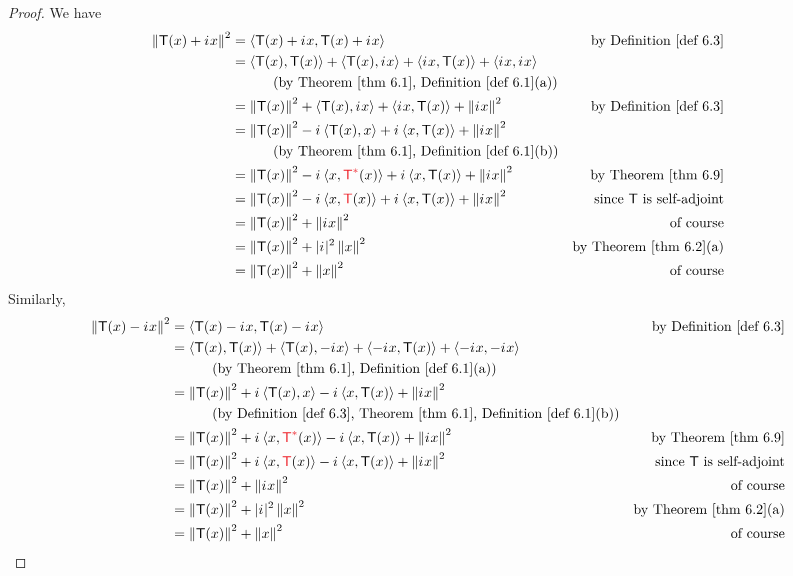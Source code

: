 \begin{proof}
We have
\begin{align*}
    \norm{\T(x) + \iu x}^2
        & = \LG \T(x) + \iu x, \T(x) + \iu x \RG & \text{by \DEF{6.3}} \\
        & = \LG \T(x), \T(x) \RG
          + \LG \T(x), \iu x \RG
          + \LG \iu x, \T(x) \RG
          + \LG \iu x, \iu x \RG \\
          & \quad \quad \quad \text{(by \THM{6.1}, \DEF{6.1}(a))} \\
        & = \norm{\T(x)}^2
          + \LG \T(x), \iu x \RG
          + \LG \iu x, \T(x) \RG
          + \norm{\iu x}^2 & \text{by \DEF{6.3}} \\
        & = \norm{\T(x)}^2 - \iu \LG \T(x), x \RG + \iu \LG x, \T(x) \RG + \norm{\iu x}^2 \\
          & \quad \quad \quad \text{(by \THM{6.1}, \DEF{6.1}(b))} \\
        & = \norm{\T(x)}^2 - \iu \LG x, \RED{\T^*}(x) \RG + \iu \LG x, \T(x) \RG + \norm{\iu x}^2 & \text{by \THM{6.9}} \\
        & = \norm{\T(x)}^2 - \iu \LG x, \RED{\T}(x) \RG + \iu \LG x, \T(x) \RG + \norm{\iu x}^2 & \text{since \(\T\) is self-adjoint} \\
        & = \norm{\T(x)}^2 + \norm{\iu x}^2 & \text{of course} \\
        & = \norm{\T(x)}^2 + \abs{\iu}^2\norm{x}^2 & \text{by \THM{6.2}(a)} \\
        & = \norm{\T(x)}^2 + \norm{x}^2 & \text{of course}
\end{align*}
Similarly,
\begin{align*}
    \norm{\T(x) - \iu x}^2
        & = \LG \T(x) - \iu x, \T(x) - \iu x \RG & \text{by \DEF{6.3}} \\
        & = \LG \T(x), \T(x) \RG
          + \LG \T(x), -\iu x \RG
          + \LG -\iu x, \T(x) \RG
          + \LG -\iu x, -\iu x \RG \\
          & \quad \quad \quad \text{(by \THM{6.1}, \DEF{6.1}(a))} \\
        & = \norm{\T(x)}^2 + \iu \LG \T(x), x \RG - \iu \LG x, \T(x) \RG + \norm{\iu x}^2 \\
          & \quad \quad \quad \text{(by \DEF{6.3}, \THM{6.1}, \DEF{6.1}(b))} \\
        & = \norm{\T(x)}^2 + \iu \LG x, \RED{\T^*}(x) \RG - \iu \LG x, \T(x) \RG + \norm{\iu x}^2 & \text{by \THM{6.9}} \\
        & = \norm{\T(x)}^2 + \iu \LG x, \RED{\T}(x) \RG - \iu \LG x, \T(x) \RG + \norm{\iu x}^2 & \text{since \(\T\) is self-adjoint} \\
        & = \norm{\T(x)}^2 + \norm{\iu x}^2 & \text{of course} \\
        & = \norm{\T(x)}^2 + \abs{\iu}^2\norm{x}^2 & \text{by \THM{6.2}(a)} \\
        & = \norm{\T(x)}^2 + \norm{x}^2 & \text{of course}
\end{align*}


\end{proof}
